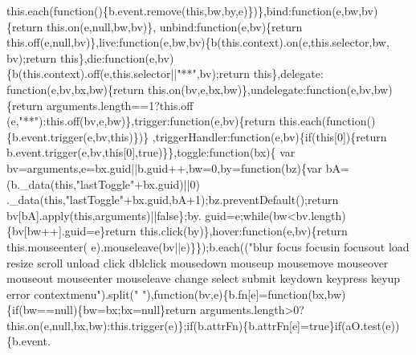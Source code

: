 \begin{DoxyCode}
      this.each(\textcolor{keyword}{function}()\{b.event.remove(\textcolor{keyword}{this},bw,by,e)\})\},bind:\textcolor{keyword}{function}(e,bw,bv)\{\textcolor{keywordflow}{return} this.on(e,null,bw,bv)\},
      unbind:\textcolor{keyword}{function}(e,bv)\{\textcolor{keywordflow}{return} this.off(e,null,bv)\},live:\textcolor{keyword}{function}(e,bw,bv)\{b(this.context).on(e,this.selector,bw,
      bv);\textcolor{keywordflow}{return} \textcolor{keyword}{this}\},die:\textcolor{keyword}{function}(e,bv)\{b(this.context).off(e,this.selector||\textcolor{stringliteral}{"**"},bv);\textcolor{keywordflow}{return} \textcolor{keyword}{this}\},delegate:\textcolor{keyword}{
      function}(e,bv,bx,bw)\{\textcolor{keywordflow}{return} this.on(bv,e,bx,bw)\},undelegate:\textcolor{keyword}{function}(e,bv,bw)\{\textcolor{keywordflow}{return} arguments.length==1?this.off
      (e,\textcolor{stringliteral}{"**"}):this.off(bv,e,bw)\},trigger:function(e,bv)\{\textcolor{keywordflow}{return} this.each(\textcolor{keyword}{function}()\{b.event.trigger(e,bv,\textcolor{keyword}{this})\})\}
      ,triggerHandler:\textcolor{keyword}{function}(e,bv)\{\textcolor{keywordflow}{if}(\textcolor{keyword}{this}[0])\{\textcolor{keywordflow}{return} b.event.trigger(e,bv,\textcolor{keyword}{this}[0],\textcolor{keyword}{true})\}\},toggle:\textcolor{keyword}{function}(bx)\{
      var bv=arguments,e=bx.guid||b.guid++,bw=0,by=\textcolor{keyword}{function}(bz)\{var bA=(b.\_data(\textcolor{keyword}{this},\textcolor{stringliteral}{"lastToggle"}+bx.guid)||0)%
      .\_data(\textcolor{keyword}{this},\textcolor{stringliteral}{"lastToggle"}+bx.guid,bA+1);bz.preventDefault();\textcolor{keywordflow}{return} bv[bA].apply(\textcolor{keyword}{this},arguments)||\textcolor{keyword}{false}\};by.
      guid=e;\textcolor{keywordflow}{while}(bw<bv.length)\{bv[bw++].guid=e\}\textcolor{keywordflow}{return} this.click(by)\},hover:\textcolor{keyword}{function}(e,bv)\{\textcolor{keywordflow}{return} this.mouseenter(
      e).mouseleave(bv||e)\}\});b.each((\textcolor{stringliteral}{"blur focus focusin focusout load resize scroll unload click dblclick
       mousedown mouseup mousemove mouseover mouseout mouseenter mouseleave change select submit keydown keypress keyup
       error contextmenu"}).split(\textcolor{stringliteral}{" "}),\textcolor{keyword}{function}(bv,e)\{b.fn[e]=\textcolor{keyword}{function}(bx,bw)\{\textcolor{keywordflow}{if}(bw==null)\{bw=bx;bx=null\}\textcolor{keywordflow}{return} 
      arguments.length>0?this.on(e,null,bx,bw):this.trigger(e)\};\textcolor{keywordflow}{if}(b.attrFn)\{b.attrFn[e]=\textcolor{keyword}{true}\}\textcolor{keywordflow}{if}(aO.test(e))\{b.event.

\end{DoxyCode}
